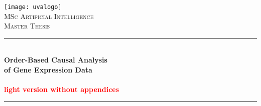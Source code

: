 
\begin{titlepage}



    \newcommand{\HRule}{\rule{\linewidth}{0.5mm}} %
    
    \center %
    
     
    
    
    
    
    
    
    \texttt{[image: uvalogo]}\\[2.5cm]
    
    \textsc{\Large MSc Artificial Intelligence}\\[0.2cm]
    
    \textsc{\Large Master Thesis}\\[0.5cm] 
    
    
    
    
    
    
    
    
    \HRule \\[0.4cm]
    
    { \huge \bfseries Order-Based Causal Analysis \\ of Gene Expression Data \\ \phantom{blabla} \\ \textcolor{red}{light version without appendices}}\\[0.4cm] %
    
    \HRule \\[0.5cm]
    
     
    
    
    

\end{titlepage}
